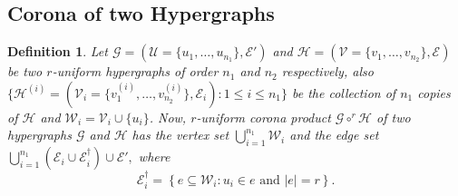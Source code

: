 \documentclass[10pt,a4paper]{article}
\newtheorem{definition}{Definition}[section]
\begin{document}
	
	\subsection{Corona of two Hypergraphs}
	
	\begin{definition}\cite{shetty2025forgotten}
		Let $\mathcal{G}=(\mathcal{U}=\{ u_1, \ldots, u_{n_1}\}, \mathcal{E}')$ and $\mathcal{H}=(\mathcal{V}=\{ v_1, \ldots, v_{n_2}\}, \mathcal{E})$ be two $r$-uniform hypergraphs of order $n_1$ and $n_2$ respectively, also $ \{ \mathcal{H}^{(i)}=(\mathcal{V}_i=\{ v_1^{(i)}, \ldots, v_{n_2}^{(i)}\}, \mathcal{E}_i): 1 \leq i \leq n_1 \}$ be the collection of $n_1$ copies of $\mathcal{H}$
		and $\mathcal{W}_i = \mathcal{V}_i \cup \{ u_i \}$.
		Now, $r$-uniform corona product  $\mathcal{G} \circ^r \mathcal{H}$ of two hypergraphs $\mathcal{G}$ and $\mathcal{H}$ has the vertex set $\bigcup\limits_{i=1}^{n_1} \mathcal{W}_i$ and the edge set $\bigcup\limits_{i=1}^{n_1} \left( \mathcal{E}_i \cup \mathcal{E}_i^{\dagger} \right) \cup \mathcal{E}',$ where
		$$ \mathcal{E}_i^\dagger = \left\{e \subseteq \mathcal{W}_i: u_i \in e
		\text{ and } \vert e \vert = r  \right\}. $$ 
	\end{definition}
	
	
	
\end{document}
